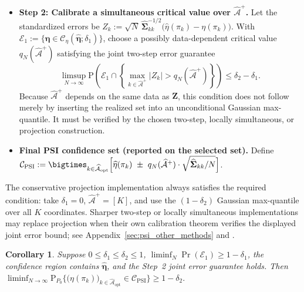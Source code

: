 \documentclass[12pt]{article}
\newtheorem{corollary}[theorem]{Corollary}
\theoremstyle{remark}\newtheorem{remark}[theorem]{Remark}\theoremstyle{plain}
\newcommand{\pr}{\mathrm{P}}
\begin{document}
\begin{itemize}
    \item \textbf{Step 2: Calibrate a simultaneous critical value over $\widehat{\mathcal{A}}^{+}$.} Let the standardized errors be
    $Z_k := \sqrt N\,\widehat{\boldsymbol{\Sigma}}_{kk}^{-1 / 2}
    \big(\widehat{\eta}(\pi_k)-\eta(\pi_k)\big)$.
    With
    $\mathcal E_1
      :=\{\bm\eta\in
      \mathcal C_\eta(\widehat{\bm\eta};\delta_1)\}$,
    choose a possibly data-dependent critical value
    $q_N(\widehat{\mathcal A}^{+})$ satisfying the joint
    two-step error guarantee
    \[
        \limsup_{N\to\infty}
        \pr\left(
        \mathcal E_1\cap
        \left\{\max_{k\in\widehat{\mathcal A}^{+}}|Z_k|
        >q_N(\widehat{\mathcal A}^{+})\right\}\right)
        \leq\delta_2-\delta_1.
    \]
    Because $\widehat{\mathcal A}^{+}$ depends on the same data as
    $\bm Z$, this condition does not follow merely by inserting the
    realized set into an unconditional Gaussian max-quantile.  It
    must be verified by the chosen two-step, locally simultaneous, or
    projection construction.

    \item \textbf{Final PSI confidence set (reported on the selected set).} Define
        $\mathcal{C}_{\text{PSI}} := \bigtimes_{k\in \widehat{\mathcal{A}}_{\text{opt}}} \Bigl[ \widehat{\eta}(\pi_k)\ \pm\ q_N(\widehat{\mathcal{A}}^{+})\cdot\sqrt{\widehat{\boldsymbol{\Sigma}}_{kk}/N}\Bigr]$.
\end{itemize}


The conservative projection implementation always satisfies the
required condition: take $\delta_1=0$,
$\widehat{\mathcal A}^{+}=[K]$, and use the
$(1-\delta_2)$ Gaussian max-quantile over all $K$ coordinates.
Sharper two-step or locally simultaneous implementations may replace
projection when their own calibration theorem verifies the displayed
joint error bound; see Appendix~\ref{sec:psi_other_methods} and
\citet{petrou2024inference}.

\begin{corollary}\label{cor:PSI}
    Suppose
    $0\leq\delta_1\leq\delta_2\leq1$,
    $\liminf_N\Pr(\mathcal E_1)\geq1-\delta_1$, the confidence region
    contains $\widehat{\bm\eta}$, and the Step~2 joint error guarantee
    holds.  Then
    $
        \liminf_{N \to \infty} \pr_{P_0} \Big\{  \big(\eta(\pi_k)\big)_{k \in \widehat{\mathcal{A}}_{\text{opt}}} \in  \mathcal{C}_{\text{PSI}} \Big\} \geq 1 - \delta_2.
    $
\end{corollary}
\end{document}
